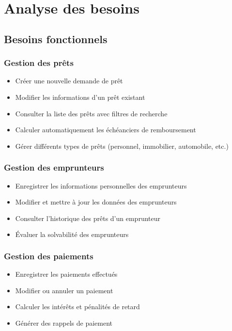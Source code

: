 \documentclass[12pt,a4paper]{report}
\begin{document}
\section{Analyse des besoins}

\subsection{Besoins fonctionnels}

\subsubsection{Gestion des prêts}
\begin{itemize}
    \item Créer une nouvelle demande de prêt
    \item Modifier les informations d'un prêt existant
    \item Consulter la liste des prêts avec filtres de recherche
    \item Calculer automatiquement les échéanciers de remboursement
    \item Gérer différents types de prêts (personnel, immobilier, automobile, etc.)
\end{itemize}

\subsubsection{Gestion des emprunteurs}
\begin{itemize}
    \item Enregistrer les informations personnelles des emprunteurs
    \item Modifier et mettre à jour les données des emprunteurs
    \item Consulter l'historique des prêts d'un emprunteur
    \item Évaluer la solvabilité des emprunteurs
\end{itemize}

\subsubsection{Gestion des paiements}
\begin{itemize}
    \item Enregistrer les paiements effectués
    \item Modifier ou annuler un paiement
    \item Calculer les intérêts et pénalités de retard
    \item Générer des rappels de paiement
\end{itemize}
\end{document}
